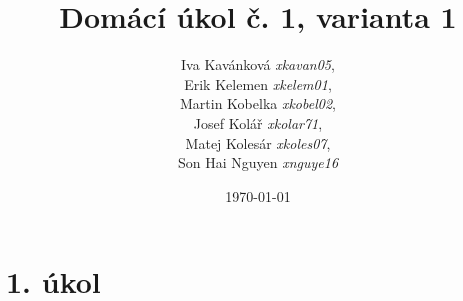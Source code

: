 \documentclass[11pt,a4paper,titlepage]{article}
\title{\textbf{Domácí úkol č. 1, varianta 1}}
\author{
	Iva Kavánková \textit{xkavan05},\\
	Erik Kelemen \textit{xkelem01},\\
	Martin Kobelka \textit{xkobel02},\\
	Josef Kolář \textit{xkolar71},\\
	Matej Kolesár \textit{xkoles07},\\
	Son Hai Nguyen \textit{xnguye16}
}
\date{\today}
\begin{document}

\pagestyle{fancy}

\section{1. úkol}
\end{document}

